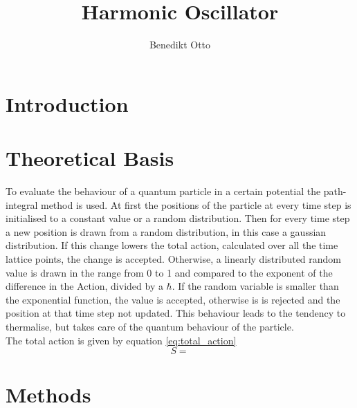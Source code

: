 \documentclass{article}
\title{Harmonic Oscillator}
\author{Benedikt Otto}
\begin{document}
	\maketitle
	\newpage
	\tableofcontents
	\newpage
	\begin{abstract}

	\end{abstract}
	\section{Introduction}
	\section{Theoretical Basis}
		To evaluate the behaviour of a quantum particle in a certain potential the path-integral method is used.
		At first the positions of the particle at every time step is initialised to a constant value or a random distribution.
		Then for every time step a new position is drawn from a random distribution, in this case a gaussian distribution.
		If this change lowers the total action, calculated over all the time lattice points, the change is accepted.
		Otherwise, a linearly distributed random value is drawn in the range from 0 to 1 and compared to the exponent of the difference in the Action, divided by a $\hbar$.
		If the random variable is smaller than the exponential function, the value is accepted, otherwise is is rejected and the position at that time step not updated.
		This behaviour leads to the tendency to thermalise, but takes care of the quantum behaviour of the particle.
		\\
		The total action is given by equation \ref{eq:total_action}
		\begin{equation}
			S =
		\end{equation}
	\section{Methods}
\end{document}
